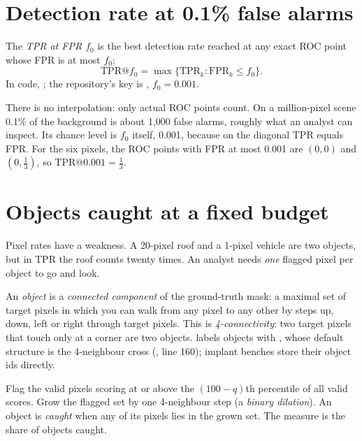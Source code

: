 \section{Detection rate at 0.1\% false alarms}\label{sec:measures:tpr}

\begin{definition}
The \emph{TPR at FPR $f_0$} is the best detection rate reached at any exact ROC point whose FPR
is at most $f_0$:
\begin{equation}\label{eq:measures:tprat}
\mathrm{TPR}@f_0 = \max\{\mathrm{TPR}_k : \mathrm{FPR}_k \le f_0\}.
\end{equation}
In code, ; the repository's key is , $f_0 = 0.001$.
\end{definition}

There is no interpolation: only actual ROC points count. On a million-pixel scene 0.1\% of the background is about
1,000 false alarms, roughly what an analyst can inspect. Its chance level is $f_0$ itself, 0.001, because on the
diagonal TPR equals FPR. For the six pixels, the ROC points with FPR at most 0.001 are $(0,0)$ and $(0, \frac13)$,
so $\mathrm{TPR}@0.001 = \frac13$.

\section{Objects caught at a fixed budget}\label{sec:measures:objects}

Pixel rates have a weakness. A 20-pixel roof and a 1-pixel vehicle are two objects, but in TPR the roof counts
twenty times. An analyst needs \emph{one} flagged pixel per object to go and look.

\begin{definition}[Object]
An \emph{object} is a \emph{connected component} of the ground-truth mask:
a maximal set of target pixels in which you can walk from any pixel to any other by steps up, down, left or right
through target pixels. This is \emph{4-connectivity}: two target pixels that touch only at a corner are two
objects.  labels objects with , whose default structure is the
4-neighbour cross (, line 160); implant benches store their object ids directly.
\end{definition}

\begin{definition}
Flag the valid pixels scoring at or above the $(100 - q)$th percentile of all valid scores. Grow the flagged set by
one 4-neighbour step (a \emph{binary dilation}). An object is \emph{caught} when any of its
pixels lies in the grown set. The measure is the share of objects caught.
\end{definition}


